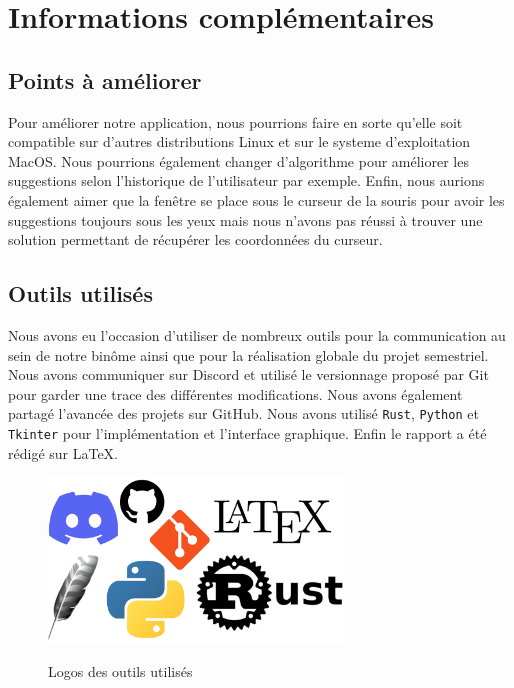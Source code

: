 \documentclass[a4paper, 11pt]{report}
\newcommand{\langage}[1]{\texttt{#1}}
\begin{document}
{\chapter{Informations complémentaires}

\section{Points à améliorer}

Pour améliorer notre application, nous pourrions faire en sorte qu'elle soit compatible sur d'autres distributions Linux et sur le systeme d'exploitation MacOS. Nous pourrions également changer d'algorithme pour améliorer les suggestions selon l'historique de l'utilisateur par exemple. Enfin, nous aurions également aimer que la fenêtre se place sous le curseur de la souris pour avoir les suggestions toujours sous les yeux mais nous n'avons pas réussi à trouver une solution permettant de récupérer les coordonnées du curseur.


\section{Outils utilisés}

Nous avons eu l'occasion d'utiliser de  nombreux outils pour la communication au sein de notre binôme ainsi que pour la réalisation globale du projet semestriel. Nous avons communiquer sur Discord et utilisé le versionnage proposé par Git pour garder une trace des différentes modifications. Nous avons également partagé l'avancée des projets sur GitHub. Nous avons utilisé \langage{Rust}, \langage{Python} et \langage{Tkinter} pour l'implémentation et l'interface graphique. Enfin le rapport a été rédigé sur \LaTeX{}.

\begin{figure}[H]
	\begin{center}
		{\includegraphics[width=0.7\textwidth]{images/outils.png}}
	\end{center}
	\caption{Logos des outils utilisés}
	\label{fig:outils}
\end{figure}
}
\end{document}
